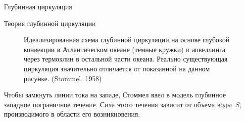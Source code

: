 \begin{chapter}{Глубинная циркуляция}
\begin{section}{Теория глубинной циркуляции}
\begin{figure}[t!]
\caption{Идеализированная схема глубинной циркуляции на основе глубокой
конвекции в Атлантическом океане (темные кружки) и 
апвеллинга через 
термоклин в остальной части океана. 
Реально существующая циркуляция значительно отличается от показанной
на данном рисунке. (Stommel, 1958)}
\label{fig:stommeldeep}
\end{figure}
%
%

Чтобы замкнуть линии тока на западе, Стоммел ввел в модель глубинное западное
пограничное течение. Сила этого течения зависит от объема воды~$S$, 
производимого в области его возникновения.
%


\end{section}
\end{chapter}
